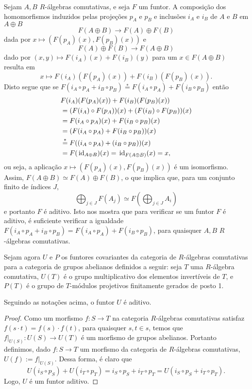 Sejam $A, B$ $R$-álgebras comutativas, e seja $F$ um funtor. A composição dos homomorfismos induzidos pelas projeções $p_A$ e $p_B$ e inclusões $i_A$ e $i_B$ de $A$ e $B$ em $A \oplus B$
\[F(A\oplus B) \rightarrow F(A)\oplus F(B)\]
dada por $x \mapsto (F(p_A)(x), F(p_B)(x))$ e \[F(A)\oplus F(B) \rightarrow F(A\oplus B)\] dado por $(x,y) \mapsto F(i_A)(x) + F(i_B)(y)$ para um $x \in F(A\oplus B)$ resulta em
\[x \mapsto F(i_A)(F(p_A)(x)) + F(i_B)(F(p_B)(x)).\] Disto segue que se  $F(i_A \circ p_A + i_B \circ p_B) \stackrel{*}{=} F(i_A \circ p_A) + F(i_B \circ p_B)$ então
\begin{align*}
    &F(i_A)(F(p_A)(x)) + F(i_B)(F(p_B)(x)) \\ &= (F(i_A)\circ F(p_A))(x) + (F(i_B)\circ F(p_B))(x) \\
    &= F(i_A \circ p_A)(x) + F(i_B \circ p_B)(x) \\
    &= (F(i_A \circ p_A) + F(i_B \circ p_B))(x) \\
    &\stackrel{*}{=} F((i_A \circ p_A) + (i_B \circ p_B))(x) \\
    &= F(\, \textrm{id}_{A\oplus B})(x) = \, \textrm{id}_{F(A\oplus B)}(x) = x,
\end{align*}
ou seja, a aplicação $x \mapsto (F(p_A)(x), F(p_B)(x))$ é um isomorfismo. Assim, $F(A\oplus B) \simeq F(A)\oplus F(B)$, o que implica que, para um conjunto finito de índices $J$, \[\bigoplus_{j \in J} F(A_j) \simeq F\left(\bigoplus_{j \in J} A_i\right)\] e portanto $F$ é aditivo. Isto nos mostra que para verificar se um funtor $F$ é aditivo, é suficiente verificar a igualdade $F(i_A \circ p_A + i_B \circ p_B) = F(i_A \circ p_A) + F(i_B \circ p_B)$, para quaisquer $A, B$ $R$-álgebras comutativas. \par
Sejam agora $U$ e $P$ os funtores covariantes da categoria de $R$-álgebras comutativas para a categoria de grupos abelianos definidos a seguir: seja $T$ uma $R$-álgebra comutativa, $U(T)$ é o grupo multiplicativo dos elementos invertíveis de $T$, e $P(T)$ é o grupo de $T$-módulos projetivos finitamente gerados de posto 1. \par
\begin{lemma}\label{lema323}
Seguindo as notações acima, o funtor $U$ é aditivo.
\begin{proof}
Como um morfismo $f:S\rightarrow T$ na categoria $R$-álgebras comutativas satisfaz $f(s\cdot t) = f(s)\cdot f(t)$, para quaisquer $s,t \in s$, temos que $f|_{U(S)}: U(S) \rightarrow U(T)$ é um morfismo de grupos abelianos. Portanto definimos, dado $f:S\rightarrow T$ um morfismo da categoria de $R$-álgebras comutativas, $U(f) := f|_{U(S)}$. Dessa forma, é claro que \[U(i_S\circ p_S) + U(i_T \circ p_T) = i_S \circ p_S + i_T \circ p_T = U(i_S\circ p_S + i_T \circ p_T).\] Logo, $U$ é um funtor aditivo.
\end{proof}
\end{lemma}
